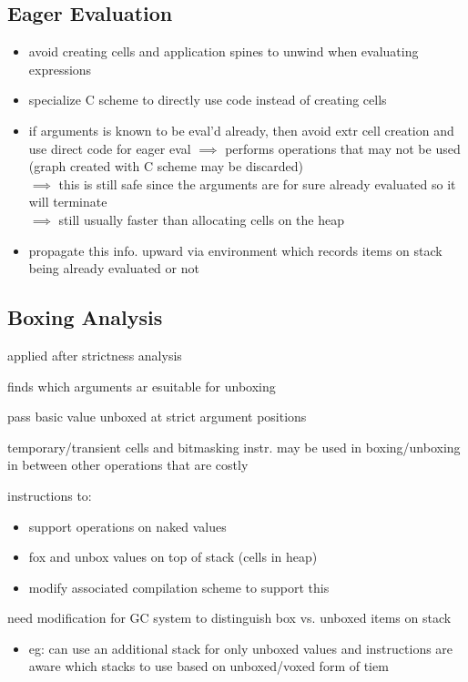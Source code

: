 \documentclass[8pt]{extarticle}
\begin{document}
\begin{multicols*}{2}
\subsection{Eager Evaluation}
\begin{itemize}
\item avoid creating cells and application spines to unwind when evaluating expressions
\item specialize C scheme to directly use code instead of creating cells
\item if arguments is known to be eval'd already, then avoid extr cell creation and use direct code for eager eval $\implies$ performs operations that may not be used (graph created with C scheme may be discarded)\\
  $\implies$ this is still safe since the arguments are for sure already evaluated so it will terminate\\
  $\implies$ still usually faster than allocating cells on the heap
\item propagate this info. upward via environment which records items on stack being already evaluated or not
\end{itemize}

\subsection{Boxing Analysis}

applied after strictness analysis

finds which arguments ar esuitable for unboxing

pass basic value unboxed at strict argument positions

temporary/transient cells and bitmasking instr. may be used in boxing/unboxing in between other operations that are costly

instructions to:
\begin{itemize}
\item support operations on naked values
\item fox and unbox values on top of stack (cells in heap)
\item modify associated compilation scheme to support this
\end{itemize}

need modification for GC system to distinguish box vs. unboxed items on stack
\begin{itemize}
\item eg: can use an additional stack for only unboxed values and instructions are aware which stacks to use based on unboxed/voxed form of tiem
\end{itemize}


\end{multicols*}
\end{document}
